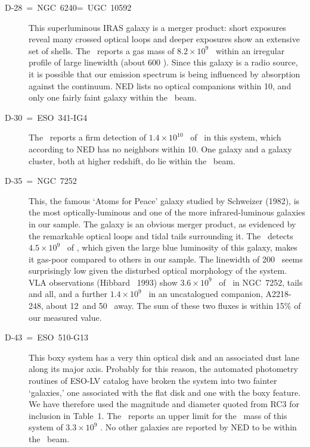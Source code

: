 \begin{description}
\item[D-28~=~NGC~6240=~UGC~10592]
This superluminous IRAS galaxy is a merger product: short exposures 
reveal many crossed optical loops and deeper exposures show an extensive 
set of shells.  
The \ reports a gas mass of $8.2 \times 10^{9}$ \MSUN\ 
within an irregular profile of large linewidth (about 600 \KMS).   
Since this galaxy is a radio source, it is possible that our emission 
spectrum is being influenced by absorption against the continuum.  NED 
lists no optical companions within 10\AMIN, and only one fairly faint 
galaxy within the \ beam.

\item[D-30~=~ESO~341-IG4]
The \GB140\ reports a firm detection of $1.4 \times 10^{10}$ \MSUN\ of 
\HI\ in this system, which according to NED has no neighbors within 10\AMIN.   
One galaxy and a galaxy cluster, both at higher redshift, do lie within the 
\GB140\ beam.  

\item[D-35~=~NGC~7252]
This, the famous `Atoms for Peace' galaxy studied by Schweizer (1982), 
is the most optically-luminous and one of the more infrared-luminous 
galaxies in our sample.  The galaxy is an obvious merger product, as 
evidenced by the remarkable optical loops and tidal tails surrounding it.  
The \GB140\ detects $4.5 \times 10^{9}$ \MSUN\ of \HI, which given 
the large blue luminosity of this galaxy, makes it gas-poor compared 
to others in our sample.  The linewidth of 200 \KMS\ seems  
surprisingly low given the disturbed optical morphology of the system.  
VLA observations (Hibbard \etal\ 1993) show 
$3.6 \times 10^{9}$ \MSUN\ of \HI\ in NGC~7252, tails and all, 
and a further $1.4 \times 10^{9}$ \MSUN\ in an uncatalogued companion, 
A2218-248, about 12\AMIN\ and 50 \KMS\ away.  
The sum of these two fluxes is within 15\% of our measured value.

\item[D-43~=~ESO~510-G13]
This boxy system has a very thin optical disk and an associated dust 
lane along its major axis.  Probably for this reason, the 
automated photometry routines of ESO-LV catalog have broken the system into two
fainter `galaxies,' one associated with the flat disk and one with the
boxy feature.  We have therefore used the magnitude and diameter quoted
from RC3 for inclusion in Table~1.  The \GB140\ reports an 
upper limit for the \HI\ mass of this system of $3.3 \times 10^{9}$ \MSUN.  
No other galaxies are reported by NED to be within the \GB140\ beam.

\end{description}

